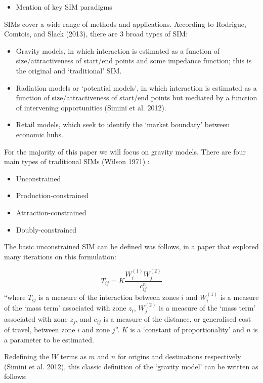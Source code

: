 \documentclass[11pt,letterpaper]{article}
\providecommand{\tightlist}{%
  \setlength{\itemsep}{0pt}\setlength{\parskip}{0pt}}
\begin{document}
\begin{itemize}
\tightlist
\item
  Mention of key SIM paradigms
\end{itemize}

SIMs cover a wide range of methods and applications.
According to Rodrigue, Comtois, and Slack (2013), there are 3 broad types of SIM:

\begin{itemize}
\item
  Gravity models, in which interaction is estimated as a function of size/attractiveness of start/end points and some impedance function; this is the original and `traditional' SIM.
\item
  Radiation models or `potential models', in which interaction is estimated as a function of size/attractiveness of start/end points but mediated by a function of intervening opportunities (Simini et al. 2012).
\item
  Retail models, which seek to identify the `market boundary' between economic hubs.
\end{itemize}

For the majority of this paper we will focus on gravity models.
There are four main types of traditional SIMs (Wilson 1971) :

\begin{itemize}
\item
  Unconstrained
\item
  Production-constrained
\item
  Attraction-constrained
\item
  Doubly-constrained
\end{itemize}

The basic unconstrained SIM can be defined was follows, in a paper that explored many iterations on this formulation:

\[
T_{i j}=K \frac{W_{i}^{(1)} W_{j}^{(2)}}{c_{i j}^{n}}
\] ``where \(T_{i j}\) is a measure of the interaction between zones \(i\) and \(W_{i}^{(1)}\) is a measure of the `mass term' associated with zone \(z_i\), \(W_{j}^{(2)}\) is a measure of the `mass term' associated with zone \(z_j\), and \(c_{ij}\) is a measure of the distance, or generalised cost of travel, between zone \(i\) and zone \(j\)''.
\(K\) is a `constant of proportionality' and \(n\) is a parameter to be estimated.

Redefining the \(W\) terms as \(m\) and \(n\) for origins and destinations respectively (Simini et al. 2012), this classic definition of the `gravity model' can be written as follows:
\end{document}
